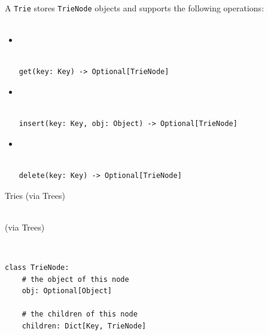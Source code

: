 \documentclass[mathserif, handout]{beamer}
\begin{document}
\begin{frame}[fragile]
  A \texttt{Trie} stores \texttt{TrieNode} objects and supports the following operations:\\~\\
  \begin{itemize}

    \item {} \\
          \\[-1mm]
          \begin{lstlisting}[style=mypython]
get(key: Key) -> Optional[TrieNode]
\end{lstlisting}

    \item {} \\
          \\[-1mm]
          \begin{lstlisting}[style=mypython]
insert(key: Key, obj: Object) -> Optional[TrieNode]
\end{lstlisting}

    \item {} \\
          \\[-1mm]
          \begin{lstlisting}[style=mypython]
delete(key: Key) -> Optional[TrieNode]
\end{lstlisting}

  \end{itemize}
\end{frame}


\begin{frame}{Tries (via Trees)}
  \begin{center}
    \Large {} \\[1mm]
    \normalsize \color{gray} (via Trees)
  \end{center}

\end{frame}


\begin{frame}[fragile]
  \begin{thmboxtop}
     \\
    \begin{lstlisting}[style=mypython]
class TrieNode:    
    # the object of this node
    obj: Optional[Object]

    # the children of this node
    children: Dict[Key, TrieNode]
\end{lstlisting}
  \end{thmboxtop}
\end{frame}
\end{document}
